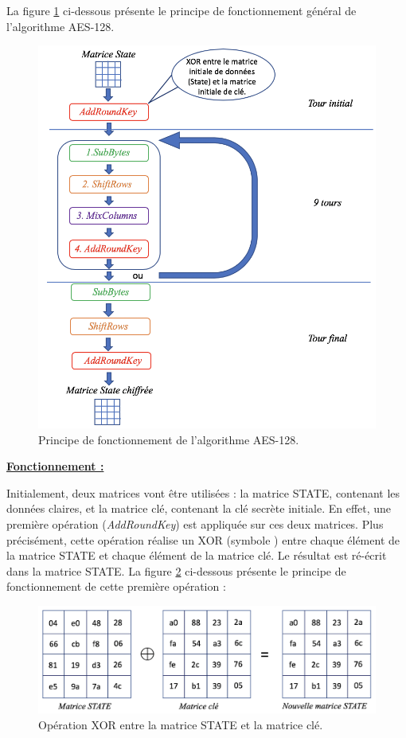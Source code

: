 \documentclass[10pt, oneside, a4paper]{article}
\begin{document}
La figure \ref{fig:AES} ci-dessous présente le principe de fonctionnement général de l'algorithme AES-128.
\begin{figure}[htbp]
    \centering
    \includegraphics[scale=0.75]{image/AES}
    \caption{Principe de fonctionnement de l'algorithme AES-128.} 
    \label{fig:AES}
\end{figure}



\underline{\textbf{Fonctionnement :}} 

Initialement, deux matrices vont être utilisées : la matrice STATE, contenant les données claires, et la matrice clé, contenant la clé secrète initiale. En effet, une première opération (\textit{AddRoundKey}) est appliquée sur ces deux matrices. Plus précisément, cette opération réalise un XOR (symbole \oplus) entre chaque élément de la matrice STATE et chaque élément de la matrice clé. Le résultat est ré-écrit dans la matrice STATE. La figure \ref{fig:XOR} ci-dessous présente le principe de fonctionnement de cette première opération :
\begin{figure}[htbp]
    \centering
    \includegraphics[scale=0.65]{image/XOR}
    \caption{Opération XOR entre la matrice STATE et la matrice clé.}
    \label{fig:XOR}
\end{figure}
\end{document}

